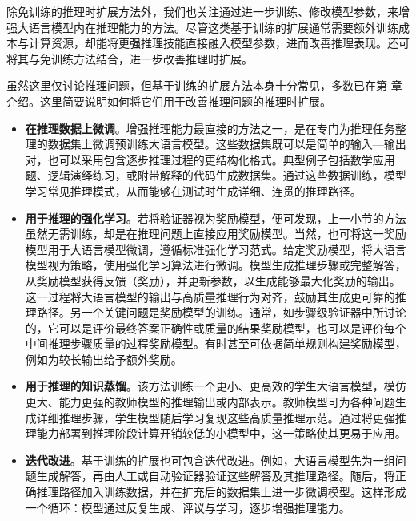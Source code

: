 除免训练的推理时扩展方法外，我们也关注通过进一步训练、修改模型参数，来增强大语言模型内在推理能力的方法。尽管这类基于训练的扩展通常需要额外训练成本与计算资源，却能将更强推理技能直接融入模型参数，进而改善推理表现。还可将其与免训练方法结合，进一步改善推理时扩展。

虽然这里仅讨论推理问题，但基于训练的扩展方法本身十分常见，多数已在第 \ChapterLLMTuning 章介绍。这里简要说明如何将它们用于改善推理问题的推理时扩展。

\begin{itemize}
\item \vspace{0.5em} \textbf{在推理数据上微调}。增强推理能力最直接的方法之一，是在专门为推理任务整理的数据集上微调预训练大语言模型。这些数据集既可以是简单的输入—输出对，也可以采用包含逐步推理过程的更结构化格式。典型例子包括数学应用题、逻辑演绎练习，或附带解释的代码生成数据集。通过这些数据训练，模型学习常见推理模式，从而能够在测试时生成详细、连贯的推理路径。
\item \vspace{0.3em} \textbf{用于推理的强化学习}。若将验证器视为奖励模型，便可发现，上一小节的方法虽然无需训练，却是在推理问题上直接应用奖励模型。当然，也可将这一奖励模型用于大语言模型微调，遵循标准强化学习范式。给定奖励模型，将大语言模型视为策略，使用强化学习算法进行微调。模型生成推理步骤或完整解答，从奖励模型获得反馈（奖励），并更新参数，以生成能够最大化奖励的输出。这一过程将大语言模型的输出与高质量推理行为对齐，鼓励其生成更可靠的推理路径。另一个关键问题是奖励模型的训练。通常，如步骤级验证器中所讨论的，它可以是评价最终答案正确性或质量的结果奖励模型，也可以是评价每个中间推理步骤质量的过程奖励模型。有时甚至可依据简单规则构建奖励模型，例如为较长输出给予额外奖励。
\item \vspace{0.3em} \textbf{用于推理的知识蒸馏}。该方法训练一个更小、更高效的学生大语言模型，模仿更大、能力更强的教师模型的推理输出或内部表示。教师模型可为各种问题生成详细推理步骤，学生模型随后学习复现这些高质量推理示范。通过将更强推理能力部署到推理阶段计算开销较低的小模型中，这一策略使其更易于应用。
\item \vspace{0.3em} \textbf{迭代改进}。基于训练的扩展也可包含迭代改进。例如，大语言模型先为一组问题生成解答，再由人工或自动验证器验证这些解答及其推理路径。随后，将正确推理路径加入训练数据，并在扩充后的数据集上进一步微调模型。这样形成一个循环：模型通过反复生成、评议与学习，逐步增强推理能力。
\end{itemize}
\vspace{0.5em}

